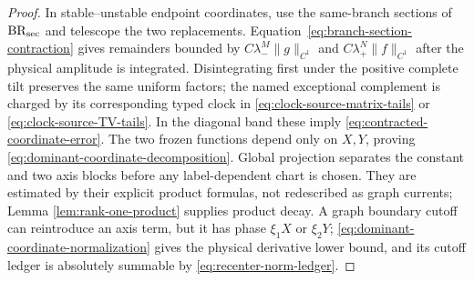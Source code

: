 \documentclass[11pt]{article}
\begin{document}
\begin{proof}
In stable--unstable endpoint coordinates, use the same-branch sections of
$\mathrm{BR}_{\rm sec}$ and telescope the two replacements.
Equation~\eqref{eq:branch-section-contraction} gives remainders bounded by
$C\lambda_-^M\|g\|_{C^1}$ and $C\lambda_+^N\|f\|_{C^1}$ after the physical
amplitude is integrated.  Disintegrating first under the positive complete
tilt preserves the same uniform factors; the named exceptional complement is
charged by its corresponding typed clock in
\eqref{eq:clock-source-matrix-tails} or
\eqref{eq:clock-source-TV-tails}.  In the diagonal band these imply
\eqref{eq:contracted-coordinate-error}.  The two frozen functions depend
only on $X,Y$, proving \eqref{eq:dominant-coordinate-decomposition}.  Global
projection separates the constant and two axis blocks before any
label-dependent chart is chosen.  They are estimated by their explicit
product formulas, not redescribed as graph currents; Lemma
\ref{lem:rank-one-product} supplies product decay.  A graph boundary
cutoff can reintroduce an axis term, but it has phase $\xi_1X$ or $\xi_2Y$;
\eqref{eq:dominant-coordinate-normalization} gives the physical derivative
lower bound, and its cutoff ledger is absolutely summable by
\eqref{eq:recenter-norm-ledger}.
\end{proof}
\end{document}
